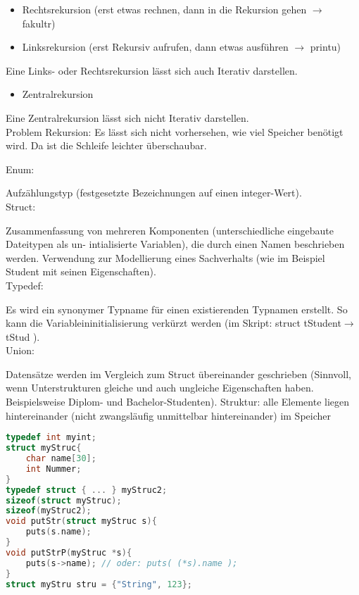 \begin{multicols*}{3}

\begin{itemize}
\item Rechtsrekursion (erst etwas rechnen, dann in die Rekursion gehen $\rightarrow$ fakultr)
\item Linksrekursion (erst Rekursiv aufrufen, dann etwas ausführen $\rightarrow$ printu)
\end{itemize}
Eine Links- oder Rechtsrekursion lässt sich auch Iterativ darstellen.
\begin{itemize}
\item Zentralrekursion
\end{itemize}
Eine Zentralrekursion lässt sich nicht Iterativ darstellen.\smallskip\\
Problem Rekursion: Es lässt sich nicht vorhersehen, wie viel Speicher benötigt wird. Da ist die Schleife leichter überschaubar.


Enum:

Aufzählungstyp (festgesetzte Bezeichnungen auf einen integer-Wert).\medskip\\
Struct:

Zusammenfassung von mehreren Komponenten (unterschiedliche eingebaute Dateitypen als un- intialisierte Variablen), die durch einen Namen beschrieben werden. Verwendung zur Modellierung eines Sachverhalts (wie im Beispiel Student mit seinen Eigenschaften).\medskip\\
Typedef:

Es wird ein synonymer Typname für einen existierenden Typnamen erstellt. So kann die Variableininitialisierung verkürzt werden (im Skript: struct tStudent$\rightarrow$tStud ).\medskip\\
Union:

Datensätze werden im Vergleich zum Struct übereinander geschrieben (Sinnvoll, wenn Unterstrukturen gleiche und auch ungleiche Eigenschaften haben. Beispielsweise Diplom- und Bachelor-Studenten).
\HRule[4pt]
Struktur: alle Elemente liegen hintereinander (nicht zwangsläufig unmittelbar hintereinander) im Speicher
\begin{lstlisting}[language=C]
typedef int myint; 
struct myStruc{
	char name[30];
	int Nummer;
} 
typedef struct { ... } myStruc2;
sizeof(struct myStruc);
sizeof(myStruc2);
void putStr(struct myStruc s){
	puts(s.name);
}
void putStrP(myStruc *s){
	puts(s->name); // oder: puts( (*s).name );
}
struct myStru stru = {"String", 123};
\end{lstlisting}


\end{multicols*}
